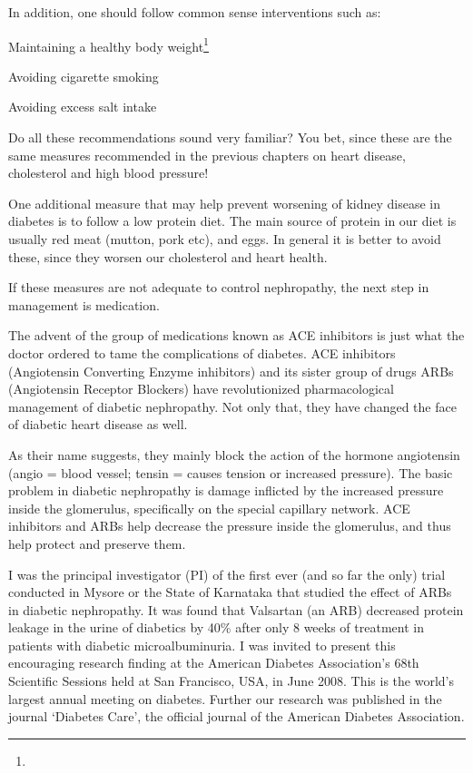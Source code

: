 {In addition, one should follow common sense interventions such as:

\item Maintaining a healthy body weight\footnote{}

 \item Avoiding cigarette smoking

 \item Avoiding excess salt intake

Do all these recommendations sound very familiar? You bet, since these are the same measures recommended in the previous chapters on heart disease, cholesterol and high blood pressure!

One additional measure that may help prevent worsening of kidney disease in diabetes is to follow a low protein diet. The main source of protein in our diet is usually red meat (mutton, pork etc), and eggs. In general it is better to avoid these, since they worsen our cholesterol and heart health.

If these measures are not adequate to control nephropathy, the next step in management is medication.


The advent of the group of medications known as ACE inhibitors is just what the doctor ordered to tame the complications of diabetes. ACE inhibitors (Angiotensin Converting Enzyme inhibitors) and its sister group of drugs ARBs (Angiotensin Receptor Blockers) have revolutionized pharmacological management of diabetic nephropathy. Not only that, they have changed the face of diabetic heart disease as well.

As their name suggests, they mainly block the action of the hormone angiotensin (angio = blood vessel; tensin = causes tension or increased pressure). The basic problem in diabetic nephropathy is damage inflicted by the increased pressure inside the glomerulus, specifically on the special capillary network. ACE inhibitors and ARBs help decrease the pressure inside the glomerulus, and thus help protect and preserve them.

I was the principal investigator (PI) of the first ever (and so far the only) trial conducted in Mysore or the State of Karnataka that studied the effect of ARBs in diabetic nephropathy. It was found that Valsartan (an ARB) decreased protein leakage in the urine of diabetics by 40\% after only 8 weeks of treatment in patients with diabetic microalbuminuria. I was invited to present this encouraging research finding at the American Diabetes Association’s 68th Scientific Sessions held at San Francisco, USA, in June 2008. This is the world’s largest annual meeting on diabetes. Further our research was published in the journal ‘Diabetes Care’, the official journal of the American Diabetes Association.

}

